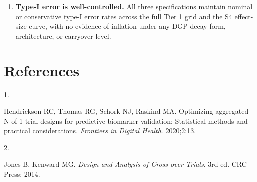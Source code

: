 \documentclass[
]{article}
\newlength{\cslhangindent}
\newlength{\csllabelwidth}
\newenvironment{CSLReferences}[2] %
 {\begin{list}{}{%
  \setlength{\itemindent}{0pt}
  \setlength{\leftmargin}{0pt}
  \setlength{\parsep}{0pt}
  \ifodd #1
   \setlength{\leftmargin}{\cslhangindent}
   \setlength{\itemindent}{-1\cslhangindent}
  \fi
  \setlength{\itemsep}{#2\baselineskip}}}
 {\end{list}}
\newcommand{\CSLLeftMargin}[1]{\parbox[t]{\csllabelwidth}{\strut#1\strut}}
\newcommand{\CSLRightInline}[1]{\parbox[t]{\linewidth - \csllabelwidth}{\strut#1\strut}}
\providecommand{\tightlist}{%
  \setlength{\itemsep}{0pt}\setlength{\parskip}{0pt}}
\begin{document}
\begin{enumerate}
  \begin{enumerate}
  \def\labelenumii{(\alph{enumii})}
  \setcounter{enumii}{1}
  \tightlist
  \item
    the assumed decay form and half-life, (c) sensitivity of
    power estimates to at least one alternative specification,
    and (d) the anticipated dropout rate, which is the dominant
    source of power loss in the evaluated grid.
  \end{enumerate}
\item
  \textbf{Type-I error is well-controlled.} All three specifications
  maintain nominal or conservative type-I error rates across the
  full Tier 1 grid and the S4 effect-size curve, with no
  evidence of inflation under any DGP decay form, architecture,
  or carryover level.
\end{enumerate}

\section*{References}\label{references}

\protect{}\label{refs}
\begin{CSLReferences}{0}{1}
\CSLLeftMargin{1. }%
\CSLRightInline{Hendrickson RC, Thomas RG, Schork NJ, Raskind MA. Optimizing aggregated {N}-of-1 trial designs for predictive biomarker validation: Statistical methods and practical considerations. \emph{Frontiers in Digital Health}. 2020;2:13.}

\CSLLeftMargin{2. }%
\CSLRightInline{Jones B, Kenward MG. \emph{Design and Analysis of Cross-over Trials}. 3rd ed. CRC Press; 2014.}

\end{CSLReferences}
\end{document}
